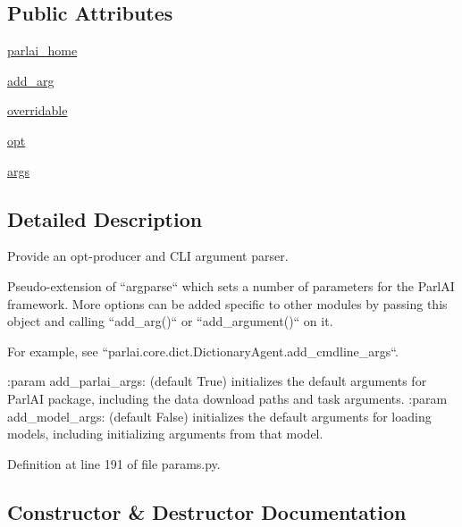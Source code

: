 \subsection*{Public Attributes}
\begin{DoxyCompactItemize}
\item 
\hyperlink{classparlai_1_1core_1_1params_1_1ParlaiParser_a5ec04b6d66c84a0418930aac367bcc35}{parlai\+\_\+home}
\item 
\hyperlink{classparlai_1_1core_1_1params_1_1ParlaiParser_a7049960456af2af847ac8721d93cda0a}{add\+\_\+arg}
\item 
\hyperlink{classparlai_1_1core_1_1params_1_1ParlaiParser_a553d6c6c3576b217b0602befa0325e6a}{overridable}
\item 
\hyperlink{classparlai_1_1core_1_1params_1_1ParlaiParser_aa7c461e146b468d033fea1d1dcd92bcf}{opt}
\item 
\hyperlink{classparlai_1_1core_1_1params_1_1ParlaiParser_a27d35bfa073588bf887cbdbf45c19f39}{args}
\end{DoxyCompactItemize}


\subsection{Detailed Description}
\begin{DoxyVerb}Provide an opt-producer and CLI argument parser.

Pseudo-extension of ``argparse`` which sets a number of parameters
for the ParlAI framework. More options can be added specific to other
modules by passing this object and calling ``add_arg()`` or
``add_argument()`` on it.

For example, see ``parlai.core.dict.DictionaryAgent.add_cmdline_args``.

:param add_parlai_args:
    (default True) initializes the default arguments for ParlAI
    package, including the data download paths and task arguments.
:param add_model_args:
    (default False) initializes the default arguments for loading
    models, including initializing arguments from that model.
\end{DoxyVerb}
 

Definition at line 191 of file params.\+py.



\subsection{Constructor \& Destructor Documentation}
\mbox{\label{classparlai_1_1core_1_1params_1_1ParlaiParser_ab1d55b343c804984783548bec009a695}} 
